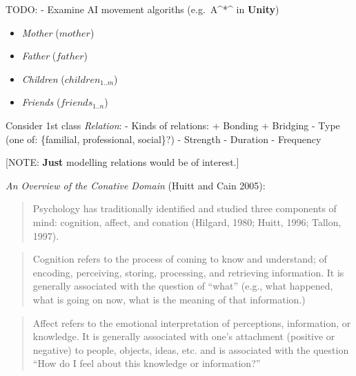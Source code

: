 \documentclass[]{article}
\begin{document}
TODO: - Examine AI movement algoriths (e.g.~A\^{}*\^{} in
\textbf{Unity})


\begin{itemize}
\itemsep1pt\parskip0pt
\item
  \emph{Mother} (\(mother\))
\item
  \emph{Father} (\(father\))
\item
  \emph{Children} (\(children_{1..m}\))
\item
  \emph{Friends} (\(friends_{1..n}\))
\end{itemize}

Consider 1st class \emph{Relation}: - Kinds of relations: + Bonding +
Bridging - Type (one of: \{familial, professional, social\}?) - Strength
- Duration - Frequency

{[}NOTE: \textbf{Just} modelling relations would be of interest.{]}


\emph{An Overview of the Conative Domain} (Huitt and Cain 2005):

\begin{quote}
Psychology has traditionally identified and studied three components of
mind: cognition, affect, and conation (Hilgard, 1980; Huitt, 1996;
Tallon, 1997).
\end{quote}

\begin{quote}
Cognition refers to the process of coming to know and understand; of
encoding, perceiving, storing, processing, and retrieving information.
It is generally associated with the question of ``what'' (e.g., what
happened, what is going on now, what is the meaning of that
information.)
\end{quote}

\begin{quote}
Affect refers to the emotional interpretation of perceptions,
information, or knowledge. It is generally associated with one's
attachment (positive or negative) to people, objects, ideas, etc. and is
associated with the question ``How do I feel about this knowledge or
information?''
\end{quote}
\end{document}
